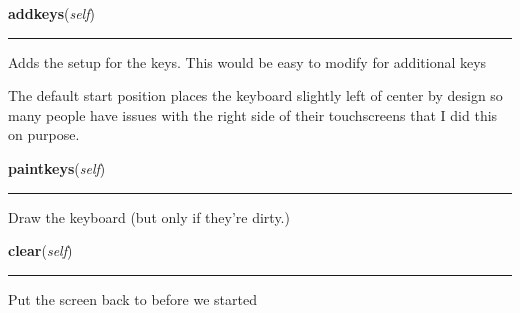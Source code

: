 \hspace{.8\funcindent}\begin{boxedminipage}{\funcwidth}

    \raggedright \textbf{addkeys}(\textit{self})

    \vspace{-1.5ex}

    \rule{\textwidth}{0.5\fboxrule}
\setlength{\parskip}{2ex}
    Adds the setup for the keys.  This would be easy to modify for 
    additional keys

    The default start position places the keyboard slightly left of center 
    by design so many people have issues with the right side of their 
    touchscreens that I did this on purpose.

\setlength{\parskip}{1ex}
    \end{boxedminipage}

    \label{pygame-asteroids:virtual_keyboard:VirtualKeyboard:paintkeys}

    \vspace{0.5ex}

\hspace{.8\funcindent}\begin{boxedminipage}{\funcwidth}

    \raggedright \textbf{paintkeys}(\textit{self})

    \vspace{-1.5ex}

    \rule{\textwidth}{0.5\fboxrule}
\setlength{\parskip}{2ex}
    Draw the keyboard (but only if they're dirty.)

\setlength{\parskip}{1ex}
    \end{boxedminipage}

    \label{pygame-asteroids:virtual_keyboard:VirtualKeyboard:clear}

    \vspace{0.5ex}

\hspace{.8\funcindent}\begin{boxedminipage}{\funcwidth}

    \raggedright \textbf{clear}(\textit{self})

    \vspace{-1.5ex}

    \rule{\textwidth}{0.5\fboxrule}
\setlength{\parskip}{2ex}
    Put the screen back to before we started

\setlength{\parskip}{1ex}
    \end{boxedminipage}


